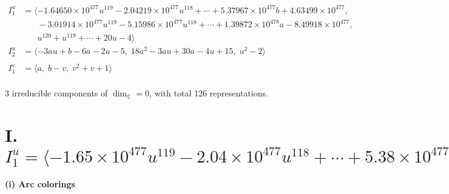 \documentclass[1p]{elsarticle_modified}
\theoremstyle{definition}
\begin{document}
\begin{align*}
I^u_{1}&=\langle 
-1.64650\times10^{477} u^{119}-2.04219\times10^{477} u^{118}+\cdots+5.37967\times10^{477} b+4.63499\times10^{477},\\
\phantom{I^u_{1}}&\phantom{= \langle  }-3.01914\times10^{477} u^{119}-5.15986\times10^{477} u^{118}+\cdots+1.39872\times10^{478} a-8.49918\times10^{477},\\
\phantom{I^u_{1}}&\phantom{= \langle  }u^{120}+u^{119}+\cdots+20 u-4\rangle \\
I^u_{2}&=\langle 
-3 a u+b-6 a-2 u-5,\;18 a^2-3 a u+30 a-4 u+15,\;u^2-2\rangle \\
\\
I^v_{1}&=\langle 
a,\;b- v,\;v^2+v+1\rangle \\
\end{align*}
\raggedright * 3 irreducible components of $\dim_{\mathbb{C}}=0$, with total 126 representations.\\
\newpage
\renewcommand{\arraystretch}{1}
\centering \section*{I. $I^u_{1}= \langle -1.65\times10^{477} u^{119}-2.04\times10^{477} u^{118}+\cdots+5.38\times10^{477} b+4.63\times10^{477},\;-3.02\times10^{477} u^{119}-5.16\times10^{477} u^{118}+\cdots+1.40\times10^{478} a-8.50\times10^{477},\;u^{120}+u^{119}+\cdots+20 u-4 \rangle$}
\flushleft \textbf{(i) Arc colorings}\\
\end{document}
